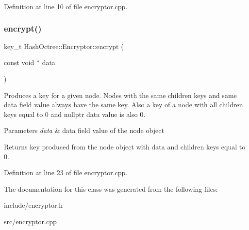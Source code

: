 Definition at line 10 of file encryptor.\+cpp.

\mbox{\label{class_hash_octree_1_1_encryptor_a96ce6d479c6b28f1f61c99989aa7a976}} 
\subsubsection{\texorpdfstring{encrypt()}{encrypt()}\hspace{0.1cm}{\footnotesize\ttfamily [3/3]}}
{\footnotesize\ttfamily key\+\_\+t Hash\+Octree\+::\+Encryptor\+::encrypt (\begin{DoxyParamCaption}\item[{const void $\ast$}]{data }\end{DoxyParamCaption})\hspace{0.3cm}{\ttfamily [static]}}

Produces a key for a given node. Nodes with the same children keys and same data field value always have the same key. Also a key of a node with all children keys equal to 0 and nullptr data value is also 0. 
\begin{DoxyParams}{Parameters}
{\em data} & data field value of the node object \\
\hline
\end{DoxyParams}
\begin{DoxyReturn}{Returns}
key produced from the node object with {\ttfamily data} and children keys equal to 0. 
\end{DoxyReturn}


Definition at line 23 of file encryptor.\+cpp.



The documentation for this class was generated from the following files\+:\begin{DoxyCompactItemize}
\item 
include/encryptor.\+h\item 
src/encryptor.\+cpp\end{DoxyCompactItemize}
